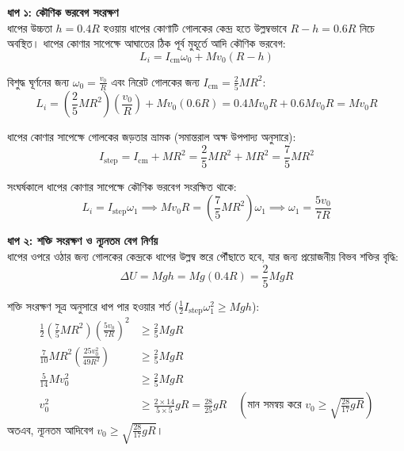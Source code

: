 \documentclass[12pt, a4paper]{article}
\begin{document}
\begin{tcolorbox}[solutionbox={সমাধান (Solution)}]
    \noindent
    \textbf{ধাপ ১: কৌণিক ভরবেগ সংরক্ষণ} \\
    ধাপের উচ্চতা $h = 0.4R$ হওয়ায় ধাপের কোণাটি গোলকের কেন্দ্র হতে উল্লম্বভাবে $R - h = 0.6R$ নিচে অবস্থিত। ধাপের কোণার সাপেক্ষে আঘাতের ঠিক পূর্ব মুহূর্তে আদি কৌণিক ভরবেগ:
    \[ L_i = I_{\text{cm}} \omega_0 + M v_0 (R - h) \]
    
    বিশুদ্ধ ঘূর্ণনের জন্য $\omega_0 = \frac{v_0}{R}$ এবং নিরেট গোলকের জন্য $I_{\text{cm}} = \frac{2}{5} M R^2$:
    \[ L_i = \left(\frac{2}{5} M R^2\right) \left(\frac{v_0}{R}\right) + M v_0 (0.6R) = 0.4 M v_0 R + 0.6 M v_0 R = M v_0 R \]
    
    ধাপের কোণার সাপেক্ষে গোলকের জড়তার ভ্রামক (সমান্তরাল অক্ষ উপপাদ্য অনুসারে):
    \[ I_{\text{step}} = I_{\text{cm}} + M R^2 = \frac{2}{5} M R^2 + M R^2 = \frac{7}{5} M R^2 \]
    
    সংঘর্ষকালে ধাপের কোণার সাপেক্ষে কৌণিক ভরবেগ সংরক্ষিত থাকে:
    \[ L_i = I_{\text{step}} \omega_1 \implies M v_0 R = \left(\frac{7}{5} M R^2\right) \omega_1 \implies \omega_1 = \frac{5 v_0}{7 R} \]
    
    \vspace{0.5em}
    \noindent\textbf{ধাপ ২: শক্তি সংরক্ষণ ও ন্যূনতম বেগ নির্ণয়} \\
    ধাপের ওপরে ওঠার জন্য গোলকের কেন্দ্রকে ধাপের উল্লম্ব স্তরে পৌঁছাতে হবে, যার জন্য প্রয়োজনীয় বিভব শক্তির বৃদ্ধি:
    \[ \Delta U = M g h = M g (0.4R) = \frac{2}{5} M g R \]
    
    শক্তি সংরক্ষণ সূত্র অনুসারে ধাপ পার হওয়ার শর্ত ($\frac{1}{2} I_{\text{step}} \omega_1^2 \ge M g h$):
    \begin{align*}
        \frac{1}{2} \left(\frac{7}{5} M R^2\right) \left(\frac{5 v_0}{7 R}\right)^2 &\ge \frac{2}{5} M g R \\
        \frac{7}{10} M R^2 \left(\frac{25 v_0^2}{49 R^2}\right) &\ge \frac{2}{5} M g R \\
        \frac{5}{14} M v_0^2 &\ge \frac{2}{5} M g R \\
        v_0^2 &\ge \frac{2 \times 14}{5 \times 5} g R = \frac{28}{25} g R \quad (\text{মান সমন্বয় করে } v_0 \ge \sqrt{\frac{28}{17} g R})
    \end{align*}
    অতএব, ন্যূনতম আদিবেগ $v_0 \ge \sqrt{\frac{28}{17} g R}$।
\end{tcolorbox}
\end{document}
